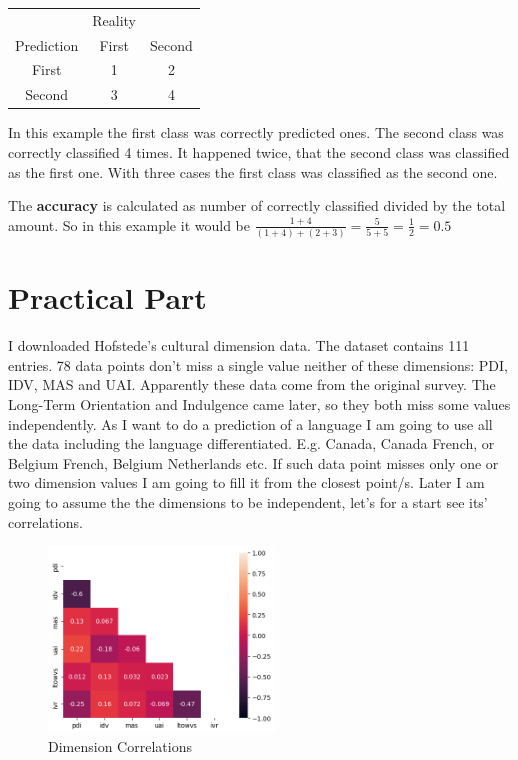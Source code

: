 \documentclass[a4paper,10pt]{article}
\begin{document}
\begin{center}
\begin{tabular}{ c|c c }
            & Reality \\
    Prediction & First & Second \\
    \hline
    First      & 1     & 2\\
    Second     & 3     & 4\\
\end{tabular}
\end{center}

In this example the first class was correctly predicted ones.
The second class was correctly classified 4 times.
It happened twice, that the second class was classified as the first one.
With three cases the first class was classified as the second one.

The \textbf{accuracy} is calculated as number of correctly classified divided by the total amount.
So in this example it would be $\frac{1+4}{(1+4)+(2+3)} = \frac{5}{5+5} = \frac{1}{2} = 0.5$

\section{Practical Part}

I downloaded Hofstede's cultural dimension data\cite{hofstedeData}.
The dataset contains 111 entries.
78 data points don't miss a single value neither of these dimensions: PDI, IDV, MAS and UAI.
Apparently these data come from the original survey.
The Long-Term Orientation and Indulgence came later, so they both miss some values independently.
As I want to do a prediction of a language I am going to use all the data including the language differentiated.
E.g. Canada, Canada French, or Belgium French, Belgium Netherlands etc.
If such data point misses only one or two dimension values I am going to fill it from the closest point/s.
Later I am going to assume the the dimensions to be independent, let's for a start see its' correlations.

\begin{figure}[H]
       \begin{center}
              \includegraphics[width=6cm]{../figures/dimension_correlations.png}
       \end{center}
       \caption{Dimension Correlations}
\end{figure}
\end{document}
